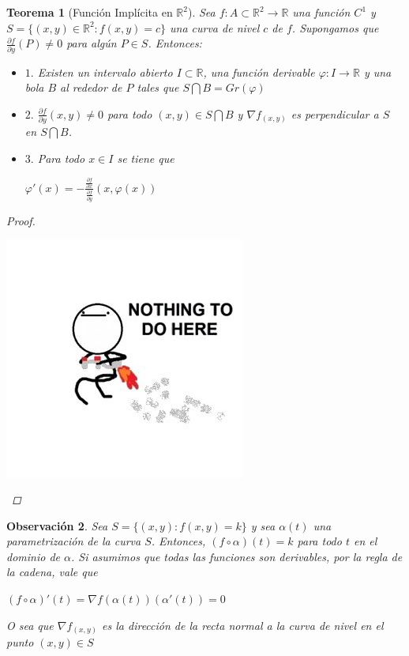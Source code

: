 \documentclass[]{article}
\newtheorem{teo}{Teorema}
\newtheorem{obs}[teo]{Observación}
\def\R{\mathbb{R}}
\newcommand{\dprim}[2]{\frac{\partial #1}{\partial #2}}
\begin{document}
\begin{teo}[Función Implícita en $\R^2$]
	Sea $f:A\subset\R^2\to\R$ una función $C^1$ y $S=\{(x,y)\in\R^2 : f(x,y)=c\}$ una curva de nivel $c$ de $f$. Supongamos que $\displaystyle \dprim{f}{y}(P)\neq 0$ para algún $P\in S$. Entonces:
	\begin{itemize}
		\item $1.$ Existen un intervalo abierto $I\subset\R$, una función derivable $\varphi:I\to\R$ y una bola $B$ al rededor de $P$ tales que $S\bigcap B = Gr(\varphi)$
		\item $2.$ $\displaystyle \dprim{f}{y}(x,y)\neq 0$ para todo $(x,y)\in S\bigcap B$ y $\nabla f_{(x,y)}$ es perpendicular a $S$ en $S\bigcap B$.
		\item $3.$ Para todo $x\in I$ se tiene que
		\begin{center}
			$\displaystyle \varphi'(x) = -\frac{\dprim{f}{x}}{\dprim{f}{y}}(x,\varphi(x))$
		\end{center}
	\end{itemize}
	\begin{proof}
		~\newline
		\begin{center}
			\includegraphics[scale=0.50]{NTD.jpg}
		\end{center}
	\end{proof}
\end{teo}

\begin{obs}
	Sea $S=\{(x,y):f(x,y)=k\}$ y sea $\alpha(t)$ una parametrización de la curva $S$. Entonces, $(f \circ \alpha)(t)=k$ para todo $t$ en el dominio de $\alpha$. Si asumimos que todas las funciones son derivables, por la regla de la cadena, vale que 
	\begin{center}
		$(f\circ\alpha)'(t) = \nabla f(\alpha(t))(\alpha'(t)) = 0$
	\end{center} 
	O sea que $\nabla f_{(x,y)}$ es la dirección de la recta normal a la curva de nivel en el punto $(x,y)\in S$
\end{obs}
\end{document}
